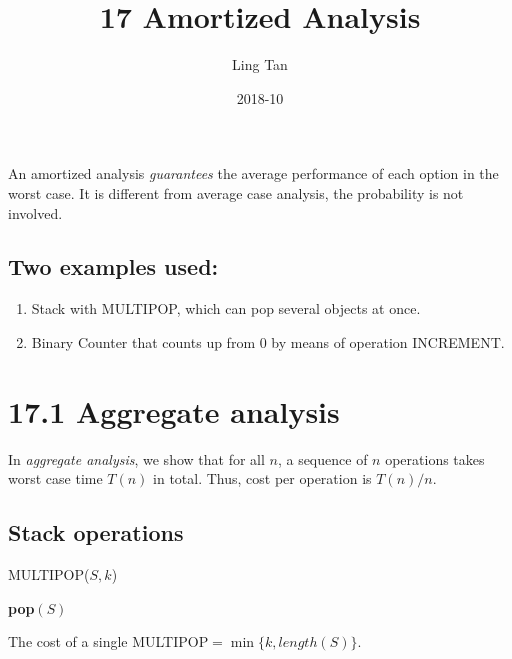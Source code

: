\documentclass[a4paper]{article}
\title{17 Amortized Analysis}
\author{Ling Tan}
\date{2018-10}
\begin{document}
\maketitle
An amortized analysis \textit{guarantees} the average performance of each option in the worst case. It is different from average case analysis, the probability is not involved.

\subsection*{Two examples used:}
\begin{enumerate}
    \item Stack with MULTIPOP, which can pop several objects at once.
    \item Binary Counter that counts up from 0 by means of operation INCREMENT.
\end{enumerate}
\section*{17.1 Aggregate analysis}
In \textit{aggregate analysis}, we show that for all $n$, a sequence of $n$ operations takes worst case time $T(n)$ in total. Thus, cost per operation is $T(n)/n$.
\subsection*{Stack operations}
\begin{algorithm}[H]%
    \caption{ MULTIPOP($S,k$)}
    \begin{algorithmic}[1] %
            \State \textbf{pop$(S)$}
        \EndFor
    \end{algorithmic}
\end{algorithm}
The cost of a single MULTIPOP$=\min\{k,length(S)\}$.
\end{document}
